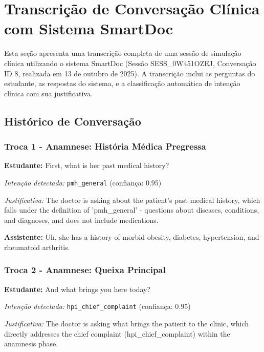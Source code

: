\section{Transcrição de Conversação Clínica com Sistema SmartDoc}
\label{appendix:conversation_transcript}

Esta seção apresenta uma transcrição completa de uma sessão de simulação clínica utilizando o sistema SmartDoc (Sessão SESS\_0W451OZEJ, Conversação ID 8, realizada em 13 de outubro de 2025). A transcrição inclui as perguntas do estudante, as respostas do sistema, e a classificação automática de intenção clínica com sua justificativa.

\subsection{Histórico de Conversação}

\subsubsection*{Troca 1 - Anamnese: História Médica Pregressa}

\textbf{Estudante:} First, what is her past medical history?

\textit{Intenção detectada:} \texttt{pmh\_general} (confiança: 0.95)

\textit{Justificativa:} The doctor is asking about the patient's past medical history, which falls under the definition of 'pmh\_general' - questions about diseases, conditions, and diagnoses, and does not include medications.

\textbf{Assistente:} Uh, she has a history of morbid obesity, diabetes, hypertension, and rheumatoid arthritis.

\vspace{0.5cm}

\subsubsection*{Troca 2 - Anamnese: Queixa Principal}

\textbf{Estudante:} And what brings you here today?

\textit{Intenção detectada:} \texttt{hpi\_chief\_complaint} (confiança: 0.95)

\textit{Justificativa:} The doctor is asking what brings the patient to the clinic, which directly addresses the chief complaint (hpi\_chief\_complaint) within the anamnesis phase.


